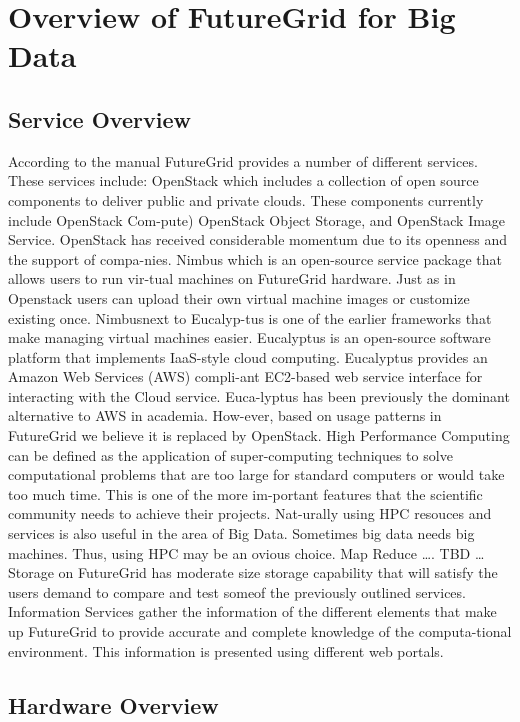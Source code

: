 \documentclass{article}
\begin{document}
\section{Overview of FutureGrid for Big Data}

\subsection{Service Overview}

According to the manual FutureGrid provides a number of different services. These services include:
OpenStack which includes a collection of open source components to deliver public and private clouds. These components currently include OpenStack Com-pute) OpenStack Object Storage, and OpenStack Image Service. OpenStack has received considerable momentum due to its openness and the support of compa-nies. 
Nimbus which is an open-source service package that allows users to run vir-tual machines on FutureGrid hardware. Just as in Openstack users can upload their own virtual machine images or customize existing once. Nimbusnext to Eucalyp-tus is one of the earlier frameworks that make managing virtual machines easier.
Eucalyptus is an open-source software platform that implements IaaS-style cloud computing. Eucalyptus provides an Amazon Web Services (AWS) compli-ant EC2-based web service interface for interacting with the Cloud service.  Euca-lyptus has been previously the dominant alternative to AWS  in academia. How-ever, based on usage patterns in FutureGrid we believe it is replaced by OpenStack.
High Performance Computing can be defined as the application of super-computing techniques to solve computational problems that are too large for standard computers or would take too much time. This is one of the more im-portant features that the scientific community needs to achieve their projects. Nat-urally using HPC resouces and services is also useful in the area of Big Data. Sometimes big data needs big machines. Thus, using HPC may be an ovious choice.
Map Reduce …. TBD …
Storage on FutureGrid has moderate size storage capability that will satisfy the users demand to compare and test someof the previously outlined services.
Information Services gather the information of the different elements that make up FutureGrid to provide accurate and complete knowledge of the computa-tional environment. This information is presented using different web portals.

\subsection{Hardware Overview}
\end{document}
